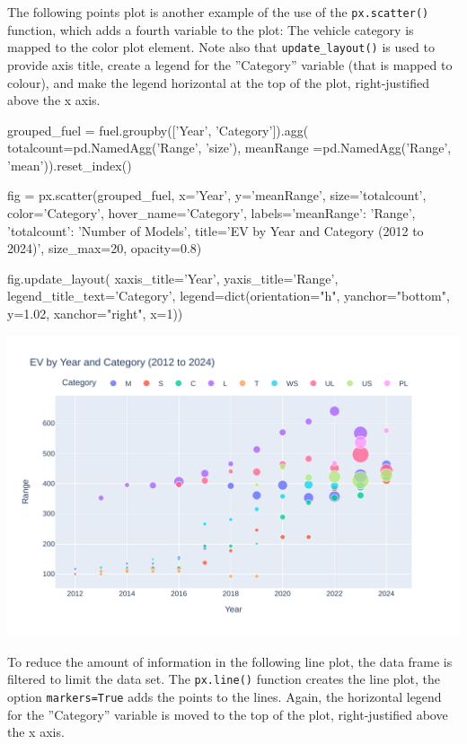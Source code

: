 The following points  plot is another example of the use of the \texttt{px.scatter()} function, which adds a fourth variable to the plot: The vehicle category is mapped to the color plot element. Note also that \texttt{update\_layout()} is used to provide axis title, create a legend for the ''Category'' variable (that is mapped to colour), and make the legend horizontal at the top of the plot, right-justified above the x axis.

\begin{samepage}
\begin{pythoncode}
grouped_fuel = fuel.groupby(['Year', 'Category']).agg(
    totalcount=pd.NamedAgg('Range', 'size'),
    meanRange =pd.NamedAgg('Range', 'mean')).reset_index()

fig = px.scatter(grouped_fuel, 
    x='Year', y='meanRange', size='totalcount', 
    color='Category', hover_name='Category', 
    labels={'meanRange': 'Range', 'totalcount': 'Number of Models'},
    title='EV by Year and Category (2012 to 2024)',
    size_max=20, opacity=0.8)

fig.update_layout(
    xaxis_title='Year',
    yaxis_title='Range',
    legend_title_text='Category',
    legend=dict(orientation="h", yanchor="bottom", 
                y=1.02, xanchor="right", x=1))
\end{pythoncode}
\end{samepage}

\begin{center}
  \includegraphics[width=.8\textwidth]{px.fuel.pointsSize.pdf}
\end{center}

To reduce the amount of information in the following line plot, the data frame is filtered to limit the data set. The \texttt{px.line()} function creates the line plot, the option \texttt{markers=True} adds the points to the lines. Again, the horizontal legend for the ''Category'' variable is moved to the top of the plot, right-justified above the x axis.

